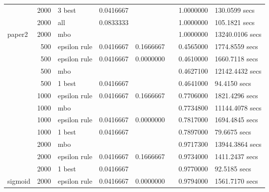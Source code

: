 \begin{longtable}[t]{lrlrrrrl}
 & 2000 & 3 best & 0.0416667 &  &  & 1.0000000 & 130.0599 secs\\

 & 2000 & all & 0.0833333 &  &  & 1.0000000 & 105.1821 secs\\

\multirow{-12}{*}{\raggedright\arraybackslash paper2} & 2000 & mbo &  &  &  & 1.0000000 & 13240.0106 secs\\
\cmidrule{1-8}
 & 500 & epsilon rule & 0.0416667 & 0.1666667 &  & 0.4565000 & 1774.8559 secs\\

 & 500 & epsilon rule & 0.0416667 & 0.0000000 &  & 0.4610000 & 1660.7118 secs\\

 & 500 & mbo &  &  &  & 0.4627100 & 12142.4432 secs\\

 & 500 & 1 best & 0.0416667 &  &  & 0.4641000 & 94.4150 secs\\

 & 1000 & epsilon rule & 0.0416667 & 0.1666667 &  & 0.7706000 & 1821.4296 secs\\

 & 1000 & mbo &  &  &  & 0.7734800 & 11144.4078 secs\\

 & 1000 & epsilon rule & 0.0416667 & 0.0000000 &  & 0.7817000 & 1694.4845 secs\\

 & 1000 & 1 best & 0.0416667 &  &  & 0.7897000 & 79.6675 secs\\

 & 2000 & mbo &  &  &  & 0.9717300 & 13944.3864 secs\\

 & 2000 & epsilon rule & 0.0416667 & 0.1666667 &  & 0.9734000 & 1411.2437 secs\\

 & 2000 & 1 best & 0.0416667 &  &  & 0.9770000 & 92.5185 secs\\

\multirow{-12}{*}{\raggedright\arraybackslash sigmoid} & 2000 & epsilon rule & 0.0416667 & 0.0000000 &  & 0.9794000 & 1561.7170 secs\\
\bottomrule
\end{longtable}
